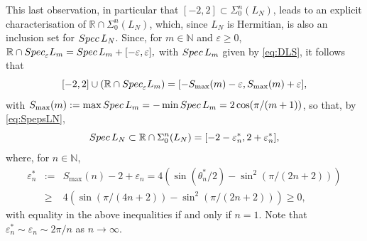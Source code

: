 \documentclass[preprint,1p,11pt]{elsarticle}
\newcommand\N{{\mathbb N}}
\newcommand\R{{\mathbb R}}
\newcommand\eps{{\varepsilon}}
\newcommand\Spec{{\rm Spec}\,}  %
\newcommand\Specn{{\rm Spec}}   %
\numberwithin{equation}{section}   %
\numberwithin{figure}{section}  %
\begin{document}
This last observation, in particular that $[-2,2]\subset \Sigma_0^n(L_N)$, leads to an explicit characterisation of  $\R\cap \Sigma_0^n(L_N)$, which, since $L_N$ is Hermitian, is also an inclusion set for $\Spec L_N$. Since, for $m\in \N$ and $\eps\geq 0$,
$
\R \cap \Specn_{\eps}L_m = \Spec L_m + [-\eps,\eps], 
$
with $\Spec L_m$ given by \eqref{eq:DLS}, it follows that
\begin{equation} \label{eq:22incl}
[-2,2] \cup (\R \cap \Specn_{\eps}L_m) = [-S_{\max}(m)-\eps,S_{\max}(m)+\eps],
\end{equation}
with $S_{\max}(m):= \max \Spec L_m = - \min \Spec L_m =2\cos(\pi/(m+1))$, so that, by \eqref{eq:SpepsLN},
\begin{equation} \label{eq:RSig}
\Spec L_N \subset \R\cap \Sigma_0^n(L_N) =  [-2-\eps^*_n,2 + \eps^*_n], 
\end{equation}
where, for $n\in \N$, 
\begin{eqnarray*}
\eps^*_n&:=&S_{\max}(n)-2+\eps_n=4(\sin(\theta^*_n/2) - \sin^2(\pi/(2n+2)))\\
&\geq &4(\sin(\pi/(4n+2))  - \sin^2(\pi/(2n+2)))\geq 0,
\end{eqnarray*}
with equality in the above inequalities if and only if $n=1$. Note that $\eps^*_n\sim \eps_n\sim  2\pi/n$ as $n\to\infty$.
\end{document}

